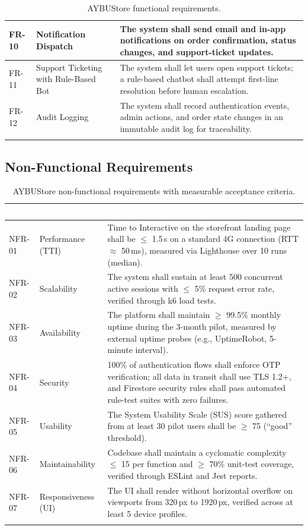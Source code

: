 \documentclass[11pt,a4paper]{article}
\begin{document}
\begin{longtable}{|p{}|p{}|p{}|}
FR-10 & Notification Dispatch & The system shall send email and in-app notifications on order confirmation, status changes, and support-ticket updates. \\ \hline
FR-11 & Support Ticketing with Rule-Based Bot & The system shall let users open support tickets; a rule-based chatbot shall attempt first-line resolution before human escalation. \\ \hline
FR-12 & Audit Logging & The system shall record authentication events, admin actions, and order state changes in an immutable audit log for traceability. \\ \hline
\caption{AYBUStore functional requirements.} \label{tab:fr} \\
\end{longtable}
 
\subsection{Non-Functional Requirements}
\begin{longtable}{|p{}|p{}|p{}|}
\hline
\rowcolor{aybuHeader}
\textcolor{white}{\textbf{ID}} &
\textcolor{white}{\textbf{Attribute}} &
\textcolor{white}{\textbf{Acceptance Criterion (Measurable)}} \\ \hline \endhead
NFR-01 & Performance (TTI) & Time to Interactive on the storefront landing page shall be $\leq$ 1.5\,s on a standard 4G connection (RTT $\approx$ 50\,ms), measured via Lighthouse over 10 runs (median). \\ \hline
NFR-02 & Scalability & The system shall sustain at least 500 concurrent active sessions with $\leq$ 5\% request error rate, verified through k6 load tests. \\ \hline
NFR-03 & Availability & The platform shall maintain $\geq$ 99.5\% monthly uptime during the 3-month pilot, measured by external uptime probes (e.g., UptimeRobot, 5-minute interval). \\ \hline
NFR-04 & Security & 100\% of authentication flows shall enforce OTP verification; all data in transit shall use TLS 1.2+, and Firestore security rules shall pass automated rule-test suites with zero failures. \\ \hline
NFR-05 & Usability & The System Usability Scale (SUS) score gathered from at least 30 pilot users shall be $\geq$ 75 (``good'' threshold). \\ \hline
NFR-06 & Maintainability & Codebase shall maintain a cyclomatic complexity $\leq$ 15 per function and $\geq$ 70\% unit-test coverage, verified through ESLint and Jest reports. \\ \hline
NFR-07 & Responsiveness (UI) & The UI shall render without horizontal overflow on viewports from 320\,px to 1920\,px, verified across at least 5 device profiles. \\ \hline
\caption{AYBUStore non-functional requirements with measurable acceptance criteria.} \label{tab:nfr} \\
\end{longtable}
 
\end{document}
